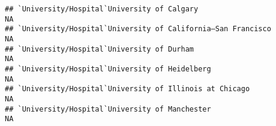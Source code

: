 \documentclass[]{article}
\begin{document}
\begin{verbatim}
## `University/Hospital`University of Calgary                                                                                                                                                                                                                                                                                                                                                                                                                                           NA
## `University/Hospital`University of California–San Francisco                                                                                                                                                                                                                                                                                                                                                                                                                          NA
## `University/Hospital`University of Durham                                                                                                                                                                                                                                                                                                                                                                                                                                            NA
## `University/Hospital`University of Heidelberg                                                                                                                                                                                                                                                                                                                                                                                                                                        NA
## `University/Hospital`University of Illinois at Chicago                                                                                                                                                                                                                                                                                                                                                                                                                               NA
## `University/Hospital`University of Manchester                                                                                                                                                                                                                                                                                                                                                                                                                                        NA

\end{verbatim}
\end{document}
